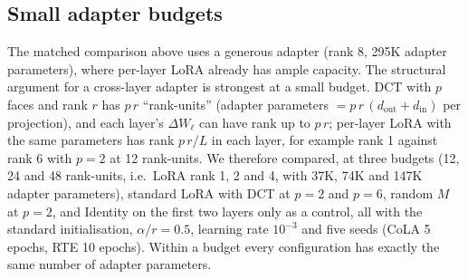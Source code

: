 \documentclass{article}
\theoremstyle{plain}
\begin{document}
\subsection{Small adapter budgets}
\label{sec:budget}

The matched comparison above uses a generous adapter (rank 8, 295K adapter parameters), where per-layer LoRA already has ample capacity.
The structural argument for a cross-layer adapter is strongest at a small budget.
DCT with $p$ faces and rank $r$ has $p\,r$ ``rank-units'' (adapter parameters $=p\,r\,(d_\mathrm{out}+d_\mathrm{in})$ per projection), and each layer's $\Delta W_\ell$ can have rank up to $p\,r$;
per-layer LoRA with the same parameters has rank $p\,r/L$ in each layer, for example rank 1 against rank 6 with $p=2$ at 12 rank-units.
We therefore compared, at three budgets (12, 24 and 48 rank-units, i.e.\ LoRA rank 1, 2 and 4, with 37K, 74K and 147K adapter parameters), standard LoRA with DCT at $p=2$ and $p=6$,
random $M$ at $p=2$, and Identity on the first two layers only as a control, all with the standard initialisation, $\alpha/r=0.5$, learning rate $10^{-3}$ and five seeds
(CoLA 5 epochs, RTE 10 epochs).
Within a budget every configuration has exactly the same number of adapter parameters.
\end{document}
